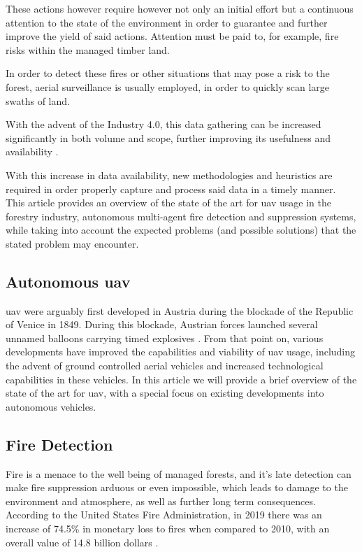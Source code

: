 \documentclass[runningheads]{llncs}
\begin{document}
These actions however require however not only an initial effort but a continuous attention to the state of the environment in order to guarantee and further improve the yield of said actions. Attention must be paid to, for example, fire risks within the managed timber land.

In order to detect these fires or other situations that may pose a risk to the forest, aerial surveillance is usually employed, in order to quickly scan large swaths of land. 

With the advent of the Industry 4.0, this data gathering can be increased significantly in both volume and scope, further improving its usefulness and availability \cite{Hood_Brady_2016}.

With this increase in data availability, new methodologies and heuristics are required in order properly capture and process said data in a timely manner. This article provides an overview of the state of the art for \acrshort{uav} usage in the forestry industry, autonomous multi-agent fire detection and suppression systems, while taking into account the expected problems (and possible solutions) that the stated problem may encounter.

\subsection{Autonomous \acrshort{uav}}

\acrshort{uav} were arguably first developed in Austria during the blockade of the Republic of Venice in 1849. During this blockade, Austrian forces launched several unnamed balloons carrying timed explosives \cite{Custers_2016}. From that point on, various developments have improved the capabilities and viability of \acrshort{uav} usage, including the advent of ground controlled aerial vehicles and increased technological capabilities in these vehicles. In this article we will provide a brief overview of the state of the art for \acrshort{uav}, with a special focus on existing developments into autonomous vehicles.

\subsection{Fire Detection}

Fire is a menace to the well being of managed forests, and it's late detection can make fire suppression arduous or even impossible, which leads to damage to the environment and atmosphere, as well as further long term consequences. According to the United States Fire Administration, in 2019 there was an increase of 74.5\% in monetary loss to fires when compared to 2010, with an overall value of 14.8 billion dollars \cite{USFA_2022}.
\end{document}
